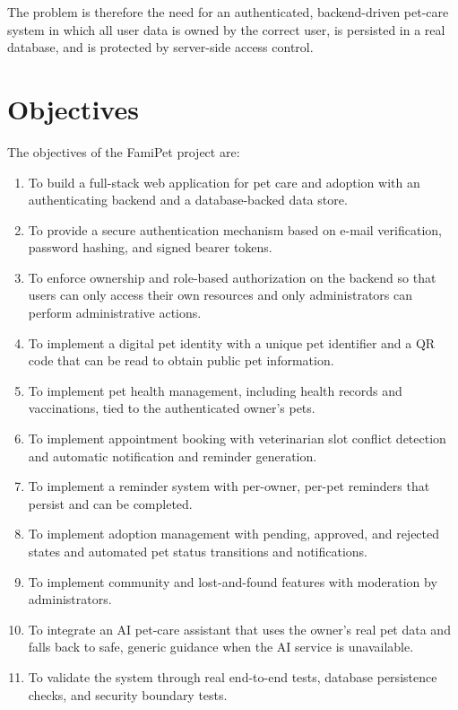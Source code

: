 The problem is therefore the need for an authenticated, backend-driven pet-care
system in which all user data is owned by the correct user, is persisted in a
real database, and is protected by server-side access control.

\section{Objectives}

The objectives of the FamiPet project are:

\begin{enumerate}
    \item To build a full-stack web application for pet care and adoption with an
    authenticating backend and a database-backed data store.
    \item To provide a secure authentication mechanism based on e-mail
    verification, password hashing, and signed bearer tokens.
    \item To enforce ownership and role-based authorization on the backend so
    that users can only access their own resources and only administrators can
    perform administrative actions.
    \item To implement a digital pet identity with a unique pet identifier and a
    QR code that can be read to obtain public pet information.
    \item To implement pet health management, including health records and
    vaccinations, tied to the authenticated owner's pets.
    \item To implement appointment booking with veterinarian slot conflict
    detection and automatic notification and reminder generation.
    \item To implement a reminder system with per-owner, per-pet reminders that
    persist and can be completed.
    \item To implement adoption management with pending, approved, and rejected
    states and automated pet status transitions and notifications.
    \item To implement community and lost-and-found features with moderation by
    administrators.
    \item To integrate an AI pet-care assistant that uses the owner's real pet
    data and falls back to safe, generic guidance when the AI service is
    unavailable.
    \item To validate the system through real end-to-end tests, database
    persistence checks, and security boundary tests.
\end{enumerate}

